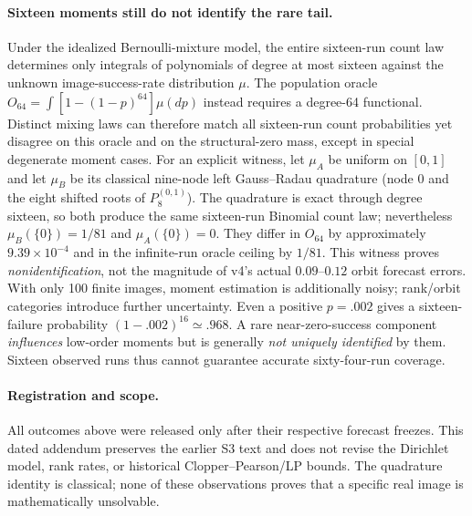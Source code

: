 \paragraph{Sixteen moments still do not identify the rare tail.}
Under the idealized Bernoulli-mixture model, the entire
sixteen-run count law determines only integrals of
polynomials of degree at most sixteen against the
unknown image-success-rate distribution $\mu$.
The population oracle
$O_{64}=\int[1-(1-p)^{64}]\mu(dp)$ instead
requires a degree-64 functional. Distinct
mixing laws can therefore match all sixteen-run
count probabilities yet disagree on this oracle
and on the structural-zero mass, except in
special degenerate moment cases.
For an explicit witness, let $\mu_A$ be uniform on
$[0,1]$ and let $\mu_B$ be its classical nine-node
left Gauss--Radau quadrature (node 0 and the eight
shifted roots of $P_8^{(0,1)}$). The quadrature
is exact through degree sixteen, so both produce
the same sixteen-run Binomial count law; nevertheless
$\mu_B(\{0\})=1/81$ and $\mu_A(\{0\})=0$.
They differ in $O_{64}$ by approximately
$9.39\times10^{-4}$ and in the infinite-run
oracle ceiling by $1/81$. This witness proves
\emph{nonidentification}, not the magnitude of
v4's actual $0.09$--$0.12$ orbit forecast errors.
With only 100 finite images, moment estimation
is additionally noisy; rank/orbit categories
introduce further uncertainty. Even a positive
$p=.002$ gives a sixteen-failure probability
$(1-.002)^{16}\simeq.968$.
A rare near-zero-success component \emph{influences}
low-order moments but is generally \emph{not uniquely
identified} by them. Sixteen observed runs thus
cannot guarantee accurate sixty-four-run coverage.

\paragraph{Registration and scope.}
All outcomes above were released only after their
respective forecast freezes. This dated addendum
preserves the earlier S3 text and does not revise
the Dirichlet model, rank rates, or historical
Clopper--Pearson/LP bounds. The quadrature identity
is classical; none of these observations proves that
a specific real image is mathematically unsolvable.
